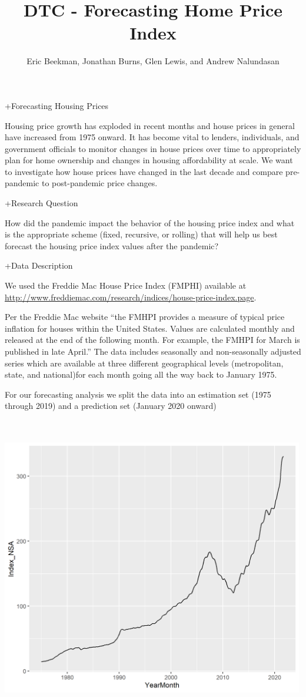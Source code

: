\documentclass[
]{article}
\title{DTC - Forecasting Home Price Index}
\author{Eric Beekman, Jonathan Burns, Glen Lewis, and Andrew Nalundasan}
\date{}
\begin{document}
\maketitle

+Forecasting Housing Prices

Housing price growth has exploded in recent months and house prices in
general have increased from 1975 onward. It has become vital to lenders,
individuals, and government officials to monitor changes in house prices
over time to appropriately plan for home ownership and changes in
housing affordability at scale. We want to investigate how house prices
have changed in the last decade and compare pre-pandemic to
post-pandemic price changes.

+Research Question

How did the pandemic impact the behavior of the housing price index and
what is the appropriate scheme (fixed, recursive, or rolling) that will
help us best forecast the housing price index values after the pandemic?

+Data Description

We used the Freddie Mac House Price Index (FMPHI) available at
\url{http://www.freddiemac.com/research/indices/house-price-index.page}.

Per the Freddie Mac website ``the FMHPI provides a measure of typical
price inflation for houses within the United States. Values are
calculated monthly and released at the end of the following month. For
example, the FMHPI for March is published in late April.'' The data
includes seasonally and non-seasonally adjusted series which are
available at three different geographical levels (metropolitan, state,
and national)for each month going all the way back to January 1975.

For our forecasting analysis we split the data into an estimation set
(1975 through 2019) and a prediction set (January 2020 onward)

\includegraphics[width=5.20833in,height=5.20833in]{NSA-graph.png}
\end{document}
